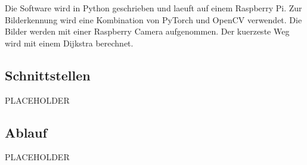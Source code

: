 Die Software wird in Python geschrieben und laeuft auf einem Raspberry Pi. Zur Bilderkennung wird eine Kombination von PyTorch und OpenCV verwendet. Die Bilder werden mit einer Raspberry Camera aufgenommen. Der kuerzeste Weg wird mit einem Dijkstra berechnet.

\subsection{Schnittstellen}

PLACEHOLDER

\subsection{Ablauf}

PLACEHOLDER